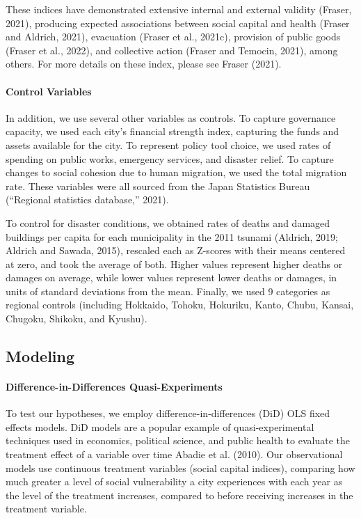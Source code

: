 \documentclass[]{elsarticle} %
\begin{document}
These indices have demonstrated extensive internal and external validity
(Fraser, 2021), producing expected associations between social capital
and health (Fraser and Aldrich, 2021), evacuation (Fraser et al.,
2021c), provision of public goods (Fraser et al., 2022), and collective
action (Fraser and Temocin, 2021), among others. For more details on
these index, please see Fraser (2021).

\hypertarget{control-variables}{%
\paragraph{Control Variables}\label{control-variables}}

In addition, we use several other variables as controls. To capture
governance capacity, we used each city's financial strength index,
capturing the funds and assets available for the city. To represent
policy tool choice, we used rates of spending on public works, emergency
services, and disaster relief. To capture changes to social cohesion due
to human migration, we used the total migration rate. These variables
were all sourced from the Japan Statistics Bureau ({``Regional
statistics database,''} 2021).

To control for disaster conditions, we obtained rates of deaths and
damaged buildings per capita for each municipality in the 2011 tsunami
(Aldrich, 2019; Aldrich and Sawada, 2015), rescaled each as Z-scores
with their means centered at zero, and took the average of both. Higher
values represent higher deaths or damages on average, while lower values
represent lower deaths or damages, in units of standard deviations from
the mean. Finally, we used 9 categories as regional controls (including
Hokkaido, Tohoku, Hokuriku, Kanto, Chubu, Kansai, Chugoku, Shikoku, and
Kyushu).

\hypertarget{modeling}{%
\subsection{Modeling}\label{modeling}}

\hypertarget{difference-in-differences-quasi-experiments}{%
\paragraph{Difference-in-Differences
Quasi-Experiments}\label{difference-in-differences-quasi-experiments}}

To test our hypotheses, we employ difference-in-differences (DiD) OLS
fixed effects models. DiD models are a popular example of
quasi-experimental techniques used in economics, political science, and
public health to evaluate the treatment effect of a variable over time
Abadie et al. (2010). Our observational models use continuous treatment
variables (social capital indices), comparing how much greater a level
of social vulnerability a city experiences with each year as the level
of the treatment increases, compared to before receiving increases in
the treatment variable.
\end{document}
